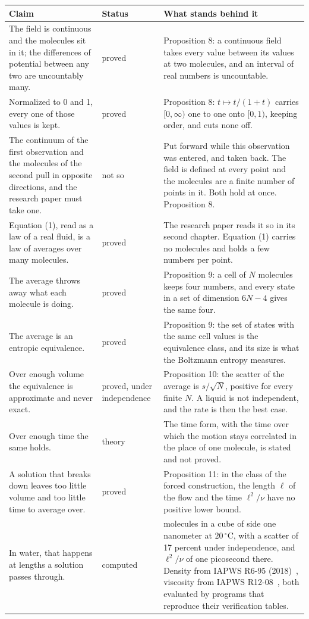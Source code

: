 \begin{longtable}{@{}>{\raggedright\arraybackslash}p{}%
>{\raggedright\arraybackslash}p{}%
>{\raggedright\arraybackslash}p{}@{}}
\toprule
Claim & Status & What stands behind it \\
\midrule
\endhead
\bottomrule
\endfoot
The field is continuous and the molecules sit in it; the differences of potential between any two
are uncountably many.
& proved
& Proposition 8: a continuous field takes every value between its values at two molecules, and an
interval of real numbers is uncountable. \\[0.6em]
Normalized to 0 and 1, every one of those values is kept.
& proved
& Proposition 8: $t \mapsto t/(1+t)$ carries $[0,\infty)$ one to one onto $[0,1)$, keeping order,
and cuts none off. \\[0.6em]
The continuum of the first observation and the molecules of the second pull in opposite
directions, and the research paper must take one.
& not so
& Put forward while this observation was entered, and taken back. The field is defined at every
point and the molecules are a finite number of points in it. Both hold at once. Proposition 8.
\\[0.6em]
Equation (1), read as a law of a real fluid, is a law of averages over many molecules.
& proved
& The research paper reads it so in its second chapter. Equation (1) carries no molecules and
holds a few numbers per point. \\[0.6em]
The average throws away what each molecule is doing.
& proved
& Proposition 9: a cell of $N$ molecules keeps four numbers, and every state in a set of dimension
$6N-4$ gives the same four. \\[0.6em]
The average is an entropic equivalence.
& proved
& Proposition 9: the set of states with the same cell values is the equivalence class, and its size
is what the Boltzmann entropy measures. \\[0.6em]
Over enough volume the equivalence is approximate and never exact.
& proved, under independence
& Proposition 10: the scatter of the average is $s/\sqrt N$, positive for every finite $N$. A liquid
is not independent, and the rate is then the best case. \\[0.6em]
Over enough time the same holds.
& theory
& The time form, with the time over which the motion stays correlated in the place of one
molecule, is stated and not proved. \\[0.6em]
A solution that breaks down leaves too little volume and too little time to average over.
& proved
& Proposition 11: in the class of the forced construction, the length $\ell$ of the flow and the
time $\ell^2/\nu$ have no positive lower bound. \\[0.6em]
In water, that happens at lengths a solution passes through.
& computed
& 33.4 molecules in a cube of side one nanometer at $20\,^\circ$C, with a scatter of 17 percent
under independence, and $\ell^2/\nu$ of one picosecond there. Density from IAPWS R6-95 (2018)~\cite{src:IAPWS-R6-95-2018},
viscosity from IAPWS R12-08~\cite{src:IAPWS-R12-08}, both evaluated by programs that reproduce their
verification tables. \\
\end{longtable}

